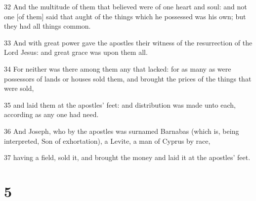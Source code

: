 \par 32 And the multitude of them that believed were of one heart and soul: and not one [of them] said that aught of the things which he possessed was his own; but they had all things common.
\par 33 And with great power gave the apostles their witness of the resurrection of the Lord Jesus: and great grace was upon them all.
\par 34 For neither was there among them any that lacked: for as many as were possessors of lands or houses sold them, and brought the prices of the things that were sold,
\par 35 and laid them at the apostles' feet: and distribution was made unto each, according as any one had need.
\par 36 And Joseph, who by the apostles was surnamed Barnabas (which is, being interpreted, Son of exhortation), a Levite, a man of Cyprus by race,
\par 37 having a field, sold it, and brought the money and laid it at the apostles' feet.

\chapter{5}


